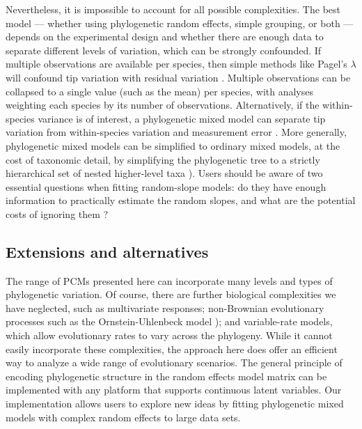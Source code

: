 \documentclass[12pt]{article}
\begin{document}
Nevertheless, it is impossible to account for all possible complexities.
The best model --- whether using phylogenetic random effects, simple grouping, or both --- depends on the experimental design and whether there are enough data to separate different levels of variation, which can be strongly confounded.
If multiple observations are available per species, then simple methods like Pagel's $\lambda$ will confound tip variation with residual variation \citep{boettiger2013is}.
Multiple observations can be collapsed to a single value (such as the mean) per species, with analyses weighting each species by its number of observations.
Alternatively, if the within-species variance is of interest, a phylogenetic mixed model can separate tip variation from within-species variation and measurement error \citep{kostikova2016bridging}.
More generally, phylogenetic mixed models can be simplified to ordinary mixed models, at the cost of taxonomic detail, by simplifying the phylogenetic tree to a strictly hierarchical set of nested higher-level taxa \citep{bunnefeld2012island}). 
Users should be aware of two essential questions when fitting random-slope models: do they have enough information to practically estimate the random slopes, and what are the potential costs of ignoring them \citep{schielzeth2008conclusions}? 

\subsection*{Extensions and alternatives}

The range of PCMs presented here can incorporate many levels and types of phylogenetic variation.
Of course, there are further biological complexities we have neglected, such as multivariate responses; non-Brownian evolutionary processes such as the Ornstein-Uhlenbeck model \citep{butler2004phylogenetic}); and variable-rate models, which allow evolutionary rates to vary across the phylogeny.
While it cannot easily incorporate these complexities, the approach here does offer an efficient way to analyze a wide range of evolutionary scenarios.
The general principle of encoding phylogenetic structure in the random effects model matrix can be implemented with any platform that supports continuous latent variables.
Our implementation allows users to explore new ideas by fitting phylogenetic mixed models with complex random effects to large data sets.
\end{document}

